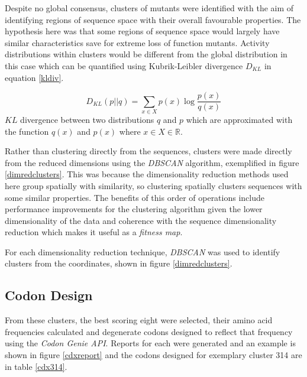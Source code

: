 \documentclass[16pt]{book}
\begin{document}
Despite no global consensus, clusters of mutants were identified with the aim of identifying regions of sequence space with their overall favourable properties.
The hypothesis here was that some regions of sequence space would largely have similar characteristics save for extreme loss of function mutants.
Activity distributions within clusters would be different from the global distribution in this case which can be quantified using Kubrik-Leibler divergence \cite{kldiver} $D_{KL}$ in equation \ref{kldiv}.

\begin{equation}\label{kldiv}
	D_{KL}(p||q) = \sum_{x \in X} p(x) \log{\frac{p(x)}{q(x)}}
\end{equation}
$KL$ divergence between two distributions $q$ and $p$ which are approximated with the function $q(x)$ and $p(x)$ where $x \in X \in \mathbb{R}$.

Rather than clustering directly from the sequences, clusters were made directly from the reduced dimensions using the \textit{DBSCAN} algorithm, exemplified in figure \ref{dimredclusters}.
This was because the dimensionality reduction methods used here group spatially with similarity, so clustering spatially clusters sequences with some similar properties.
The benefits of this order of operations include performance improvements for the clustering algorithm given the lower dimensionality of the data and coherence with the sequence dimensionality reduction which makes it useful as a \textit{fitness map}.

For each dimensionality reduction technique, \textit{DBSCAN} was used to identify clusters from the coordinates, shown in figure \ref{dimredclusters}.


\subsection{Codon Design}
From these clusters, the best scoring eight were selected, their amino acid frequencies calculated and degenerate codons designed to reflect that frequency using the \textit{Codon Genie API}.
Reports for each were generated and an example is shown in figure \ref{cdxreport} and the codons designed for exemplary cluster 314 are in table \ref{cdx314}.
\end{document}
